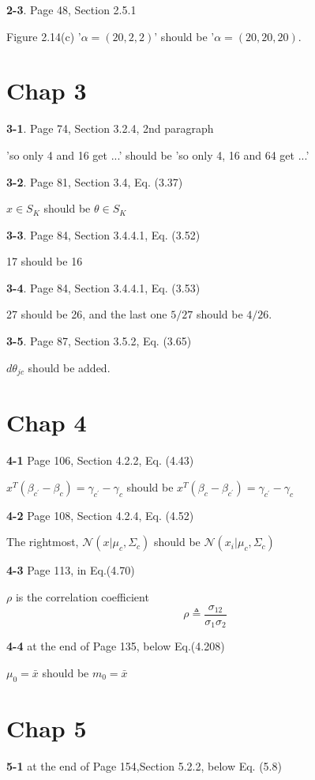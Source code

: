\documentclass[aps,preprint,a4]{revtex4-1}
\begin{document}
{\color{red}\textbf{2-3}}. Page 48, Section 2.5.1

Figure 2.14(c) '$\alpha = (20,2,2)$' should be '$\alpha = (20,20,20)$.
\section{Chap 3}
{\color{red}\textbf{3-1}}. Page 74, Section 3.2.4, 2nd paragraph

'so only 4 and 16 get ...' should be 'so only 4, 16 and 64 get ...'

{\color{red}\textbf{3-2}}.  Page 81, Section 3.4, Eq. (3.37)

$x\in S_{K}$ should be $\theta \in S_{K}$ 

{\color{red}\textbf{3-3}}.  Page 84, Section 3.4.4.1, Eq. (3.52)

17 should be 16

{\color{red}\textbf{3-4}}.  Page 84, Section 3.4.4.1, Eq. (3.53)

27 should be 26, and the last one $5/27$ should be $4/26$.

{\color{red}\textbf{3-5}}.  Page 87, Section 3.5.2, Eq. (3.65)

$d\theta_{jc}$ should be added.

\section{Chap 4}
{\color{red}\textbf{4-1}} Page 106, Section 4.2.2, Eq. (4.43)

$x^{T}(\beta_{c^{\prime}}-\beta_{c})=\gamma_{c^{\prime}}-\gamma_{c}$
should be
 $x^{T}(\beta_{c}-\beta_{c^{\prime}})=\gamma_{c^{\prime}}-\gamma_{c}$

{\color{red}\textbf{4-2}} Page 108, Section 4.2.4, Eq. (4.52)

The rightmost, $\mathcal N(x|\mu_{c},\Sigma_{c})$ should be
$\mathcal N(x_{i}|\mu_{c},\Sigma_{c})$

{\color{red}\textbf{4-3}} Page 113, in Eq.(4.70)

$\rho$ is the correlation coefficient
\begin{equation}
\rho  \triangleq \frac{\sigma_{12}}{\sigma_{1}\sigma_{2}}
\end{equation}

{\color{red}\textbf{4-4}} at the end of Page 135, below Eq.(4.208)

$\mu_{0}=\bar{x}$ should be $m_{0}=\bar{x}$

\section{Chap 5}
{\color{red}\textbf{5-1}} at the end of Page 154,Section 5.2.2, below Eq. (5.8)
\end{document}
